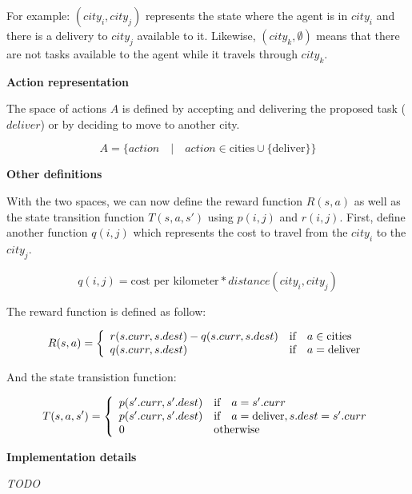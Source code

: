 \documentclass[11pt,a4paper]{article}
\begin{document}
For example: $(city_i, city_j)$ represents the state where the agent is
in $city_i$ and there is a delivery to $city_j$ available to it. Likewise,
$(city_k, \emptyset)$ means that there are not tasks available to the agent
while it travels through $city_k$.

\medskip
\textbf{Action representation}

The space of actions $A$ is defined by accepting and delivering the proposed task ($deliver$) or by deciding to move to another city.

$$ A = \{ action \quad | \quad action \in \text{cities} \cup \{\text{deliver}\} \} $$

\medskip
\textbf{Other definitions}

With the two spaces, we can now define the reward function $R(s,a)$ as well as the state transition function $T(s,a,s')$ using $p(i,j)$ and $r(i,j)$. First, define another function $q(i,j)$ which represents the cost to travel from
the $city_i$ to the $city_j$.

$$ q(i, j) = \text{cost per kilometer} * distance(city_i, city_j) $$

The reward function is defined as follow:

$$ R(s, a) = \left\{
    \begin{array}{l l}
        r(s.curr, s.dest) - q(s.curr, s.dest) & \text{if} \quad a \in \text{cities} \\
        q(s.curr, s.dest) & \text{if} \quad a = \text{deliver}
    \end{array} \right. $$

And the state transistion function:

$$ T(s, a, s') = \left\{
    \begin{array}{l l}
        p(s'.curr, s'.dest) & \text{if} \quad a = s'.curr \\
        p(s'.curr, s'.dest) & \text{if} \quad a = \text{deliver}, s.dest = s'.curr \\
        0 & \text{otherwise}
    \end{array} \right. $$


\bigskip
\textbf{Implementation details}

\emph{TODO}
\end{document}
